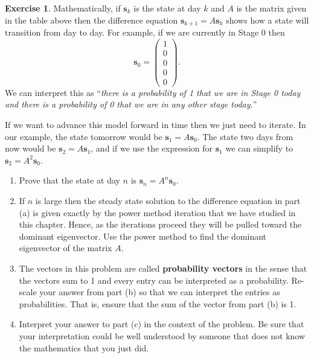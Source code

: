 \documentclass[
]{book}
\providecommand{\tightlist}{%
  \setlength{\itemsep}{0pt}\setlength{\parskip}{0pt}}
\theoremstyle{definition}
\theoremstyle{definition}
\theoremstyle{definition}
\newtheorem{exercise}{Exercise}[chapter]
\theoremstyle{remark}
\begin{document}
\begin{exercise}
Mathematically, if \(\boldsymbol{s}_k\) is the state at day \(k\) and \(A\) is the matrix given in the table above then the difference equation \(\boldsymbol{s}_{k+1} = A \boldsymbol{s}_k\) shows how a state will transition from day to day. For example, if we are currently in Stage 0 then \[ \boldsymbol{s}_0 = \begin{pmatrix} 1 \\ 0 \\ 0 \\ 0 \\ 0 \end{pmatrix}. \]
We can interpret this as ``\emph{there is a probability of 1 that we are in Stage 0 today and there is a probability of 0 that we are in any other stage today.}''

If we want to advance this model forward in time then we just need to iterate. In our example, the state tomorrow would be \(\boldsymbol{s}_1 = A \boldsymbol{s}_0\). The state two days from now would be \(\boldsymbol{s}_2 = A \boldsymbol{s}_1\), and if we use the expression for \(\boldsymbol{s}_1\) we can simplify to \(\boldsymbol{s}_2 = A^2 \boldsymbol{s}_0\).

\begin{enumerate}
\def\labelenumi{\alph{enumi}.}
\tightlist
\item
  Prove that the state at day \(n\) is \(\boldsymbol{s}_n = A^n \boldsymbol{s}_0\).
\item
  If \(n\) is large then the steady state solution to the difference equation in part (a) is given exactly by the power method iteration that we have studied in this chapter. Hence, as the iterations proceed they will be pulled toward the dominant eigenvector. Use the power method to find the dominant eigenvector of the matrix \(A\).\\
\item
  The vectors in this problem are called \textbf{probability vectors} in the sense that the vectors sum to 1 and every entry can be interpreted as a probability. Re-scale your answer from part (b) so that we can interpret the entries as probabilities. That is, ensure that the sum of the vector from part (b) is 1.\\
\item
  Interpret your answer to part (c) in the context of the problem. Be sure that your interpretation could be well understood by someone that does not know the mathematics that you just did.
\end{enumerate}
\end{exercise}
\end{document}
